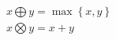 \documentclass[12pt]{beamer}
\begin{document}
    \begin{eqnarray*}
        x\bigoplus y=\max\left\{x,y\right\}\\
        x\bigotimes y=x+y
    \end{eqnarray*}
\end{document}
